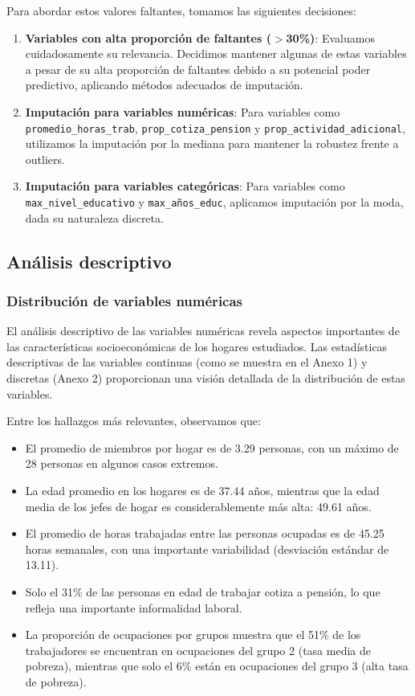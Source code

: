 \documentclass[12pt,a4paper,onecolumn]{article}
\begin{document}
Para abordar estos valores faltantes, tomamos las siguientes decisiones:

\begin{enumerate}
   \item \textbf{Variables con alta proporción de faltantes ($>$30\%)}: Evaluamos cuidadosamente su relevancia. Decidimos mantener algunas de estas variables a pesar de su alta proporción de faltantes debido a su potencial poder predictivo, aplicando métodos adecuados de imputación.

   \item \textbf{Imputación para variables numéricas}: Para variables como \texttt{promedio\_horas\_trab}, \texttt{prop\_cotiza\_pension} y \texttt{prop\_actividad\_adicional}, utilizamos la imputación por la mediana para mantener la robustez frente a outliers.

   \item \textbf{Imputación para variables categóricas}: Para variables como \texttt{max\_nivel\_educativo} y \texttt{max\_años\_educ}, aplicamos imputación por la moda, dada su naturaleza discreta.
\end{enumerate}

\subsection{Análisis descriptivo}

\subsubsection{Distribución de variables numéricas}

El análisis descriptivo de las variables numéricas revela aspectos importantes de las características socioeconómicas de los hogares estudiados. Las estadísticas descriptivas de las variables continuas (como se muestra en el Anexo 1) y discretas (Anexo 2) proporcionan una visión detallada de la distribución de estas variables.

Entre los hallazgos más relevantes, observamos que:

\begin{itemize}
   \item El promedio de miembros por hogar es de 3.29 personas, con un máximo de 28 personas en algunos casos extremos.
   \item La edad promedio en los hogares es de 37.44 años, mientras que la edad media de los jefes de hogar es considerablemente más alta: 49.61 años.
   \item El promedio de horas trabajadas entre las personas ocupadas es de 45.25 horas semanales, con una importante variabilidad (desviación estándar de 13.11).
   \item Solo el 31\% de las personas en edad de trabajar cotiza a pensión, lo que refleja una importante informalidad laboral.
   \item La proporción de ocupaciones por grupos muestra que el 51\% de los trabajadores se encuentran en ocupaciones del grupo 2 (tasa media de pobreza), mientras que solo el 6\% están en ocupaciones del grupo 3 (alta tasa de pobreza).
\end{itemize}
\end{document}
